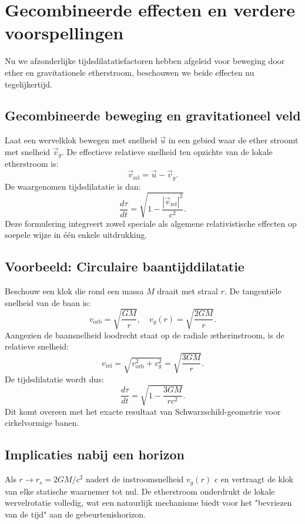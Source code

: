 \section{Gecombineerde effecten en verdere voorspellingen}

Nu we afzonderlijke tijdsdilatatiefactoren hebben afgeleid voor beweging door ether en gravitationele etherstroom, beschouwen we beide effecten nu tegelijkertijd.

\subsection*{Gecombineerde beweging en gravitationeel veld}

Laat een wervelklok bewegen met snelheid $\vec{u}$ in een gebied waar de ether stroomt met snelheid $\vec{v}_g$. De effectieve relatieve snelheid ten opzichte van de lokale etherstroom is:
\[
    \vec{v}_{\text{rel}} = \vec{u} - \vec{v}_g.
\]
De waargenomen tijdsdilatatie is dan:
\[
    \frac{d\tau}{dt} = \sqrt{1 - \frac{|\vec{v}_{\text{rel}}|^2}{c^2}}. \tag{5}
\]
Deze formulering integreert zowel speciale als algemene relativistische effecten op soepele wijze in één enkele uitdrukking.

\subsection*{Voorbeeld: Circulaire baantijddilatatie}

Beschouw een klok die rond een massa $M$ draait met straal $r$. De tangentiële snelheid van de baan is:
\[
    v_{\text{orb}} = \sqrt{\frac{GM}{r}}, \quad v_g(r) = \sqrt{\frac{2GM}{r}}.
\]
Aangezien de baansnelheid loodrecht staat op de radiale ætherinstroom, is de relatieve snelheid:
\[
    v_{\text{rel}} = \sqrt{v_{\text{orb}}^2 + v_g^2} = \sqrt{\frac{3GM}{r}}. \]
De tijdsdilatatie wordt dus:
\[
    \frac{d\tau}{dt} = \sqrt{1 - \frac{3GM}{rc^2}}. \tag{6}
\]
Dit komt overeen met het exacte resultaat van Schwarzschild-geometrie voor cirkelvormige banen.

\subsection*{Implicaties nabij een horizon}

Als $r \to r_s = 2GM/c^2$ nadert de instroomsnelheid $v_g(r)$ $c$ en vertraagt de klok van elke statische waarnemer tot nul. De etherstroom onderdrukt de lokale wervelrotatie volledig, wat een natuurlijk mechanisme biedt voor het "bevriezen van de tijd" aan de gebeurtenishorizon.

